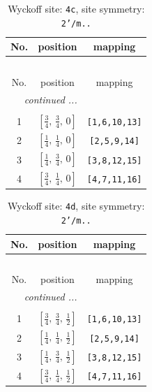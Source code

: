 \documentclass[fleqn,8pt]{jsarticle}
\begin{document}
\renewcommand{\arraystretch}{1.2}
\begin{longtable}{ccc}
\caption{Wyckoff site: {\tt 4c}, site symmetry: {\tt 2'/m..}}
 \\
 \hline \hline
No. & position & mapping \\ \hline \endfirsthead

\multicolumn{2}{l}{\tablename\ \thetable{}} \\
 \hline \hline
No. & position & mapping \\ \hline \endhead

 \hline \hline
\multicolumn{2}{r}{\footnotesize\it continued ...} \\ \endfoot

 \hline \hline
\multicolumn{2}{r}{} \\ \endlastfoot

1 & $\left[ \frac{3}{4},\, \frac{3}{4},\, 0 \right]$ & {\tt [1,6,10,13]} \\ \hline
2 & $\left[ \frac{1}{4},\, \frac{1}{4},\, 0 \right]$ & {\tt [2,5,9,14]} \\ \hline
3 & $\left[ \frac{1}{4},\, \frac{3}{4},\, 0 \right]$ & {\tt [3,8,12,15]} \\ \hline
4 & $\left[ \frac{3}{4},\, \frac{1}{4},\, 0 \right]$ & {\tt [4,7,11,16]} \\
\end{longtable}
\renewcommand{\arraystretch}{1.2}
\begin{longtable}{ccc}
\caption{Wyckoff site: {\tt 4d}, site symmetry: {\tt 2'/m..}}
 \\
 \hline \hline
No. & position & mapping \\ \hline \endfirsthead

\multicolumn{2}{l}{\tablename\ \thetable{}} \\
 \hline \hline
No. & position & mapping \\ \hline \endhead

 \hline \hline
\multicolumn{2}{r}{\footnotesize\it continued ...} \\ \endfoot

 \hline \hline
\multicolumn{2}{r}{} \\ \endlastfoot

1 & $\left[ \frac{3}{4},\, \frac{3}{4},\, \frac{1}{2} \right]$ & {\tt [1,6,10,13]} \\ \hline
2 & $\left[ \frac{1}{4},\, \frac{1}{4},\, \frac{1}{2} \right]$ & {\tt [2,5,9,14]} \\ \hline
3 & $\left[ \frac{1}{4},\, \frac{3}{4},\, \frac{1}{2} \right]$ & {\tt [3,8,12,15]} \\ \hline
4 & $\left[ \frac{3}{4},\, \frac{1}{4},\, \frac{1}{2} \right]$ & {\tt [4,7,11,16]} \\
\end{longtable}
\end{document}
